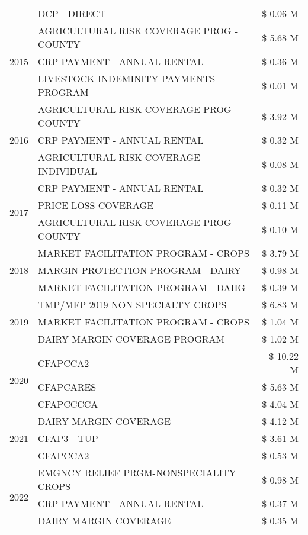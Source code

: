 \begin{tabular}{llr}
 & DCP - DIRECT & \$ 0.06 M \\
\cline{1-3}
\multirow[t]{3}{*}{2015} & AGRICULTURAL RISK COVERAGE PROG - COUNTY & \$ 5.68 M \\
 & CRP PAYMENT - ANNUAL RENTAL & \$ 0.36 M \\
 & LIVESTOCK INDEMINITY PAYMENTS PROGRAM & \$ 0.01 M \\
\cline{1-3}
\multirow[t]{3}{*}{2016} & AGRICULTURAL RISK COVERAGE PROG - COUNTY & \$ 3.92 M \\
 & CRP PAYMENT - ANNUAL RENTAL & \$ 0.32 M \\
 & AGRICULTURAL RISK COVERAGE - INDIVIDUAL & \$ 0.08 M \\
\cline{1-3}
\multirow[t]{3}{*}{2017} & CRP PAYMENT - ANNUAL RENTAL & \$ 0.32 M \\
 & PRICE LOSS COVERAGE & \$ 0.11 M \\
 & AGRICULTURAL RISK COVERAGE PROG - COUNTY & \$ 0.10 M \\
\cline{1-3}
\multirow[t]{3}{*}{2018} & MARKET FACILITATION PROGRAM - CROPS & \$ 3.79 M \\
 & MARGIN PROTECTION PROGRAM - DAIRY & \$ 0.98 M \\
 & MARKET FACILITATION PROGRAM - DAHG & \$ 0.39 M \\
\cline{1-3}
\multirow[t]{3}{*}{2019} & TMP/MFP 2019 NON SPECIALTY CROPS & \$ 6.83 M \\
 & MARKET FACILITATION PROGRAM - CROPS & \$ 1.04 M \\
 & DAIRY MARGIN COVERAGE PROGRAM & \$ 1.02 M \\
\cline{1-3}
\multirow[t]{3}{*}{2020} & CFAPCCA2 & \$ 10.22 M \\
 & CFAPCARES & \$ 5.63 M \\
 & CFAPCCCCA & \$ 4.04 M \\
\cline{1-3}
\multirow[t]{3}{*}{2021} & DAIRY MARGIN COVERAGE & \$ 4.12 M \\
 & CFAP3 - TUP & \$ 3.61 M \\
 & CFAPCCA2 & \$ 0.53 M \\
\cline{1-3}
\multirow[t]{3}{*}{2022} & EMGNCY RELIEF PRGM-NONSPECIALITY CROPS & \$ 0.98 M \\
 & CRP PAYMENT - ANNUAL RENTAL & \$ 0.37 M \\
 & DAIRY MARGIN COVERAGE & \$ 0.35 M \\
\cline{1-3}
\bottomrule
\end{tabular}
